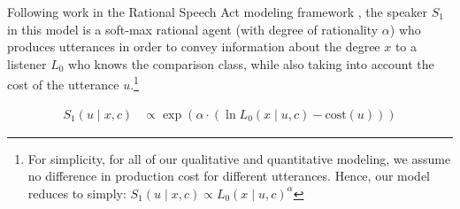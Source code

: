 \documentclass[doc]{apa6}
\newcommand{\ndg}[1]{\textcolor{Green}{[ndg: #1]}}
\begin{document}
Following work in the Rational Speech Act modeling framework \cite{Frank2012, Goodman2016, scontras2017probabilistic}, the speaker $S_1$ in this model is a soft-max rational agent (with degree of rationality $\alpha$) who produces utterances in order to convey information about the degree $x$ to a listener $L_0$ who knows the comparison class, while also taking into account the cost of the utterance $u$.\footnote{For simplicity, for all of our qualitative and quantitative modeling, we assume no difference in production cost for different utterances. Hence, our model reduces to simply: $S_1(u \mid x, c) \propto L_{0}(x \mid u, c)^{ \alpha}$}


\begin{align}
S_1(u \mid x, c) &\propto \exp{(\alpha \cdot (\ln L_{0}(x \mid u, c) - \text{cost}(u) ))}\label{eq:S1} 
\end{align}





%
%
%
%
%
\end{document}
